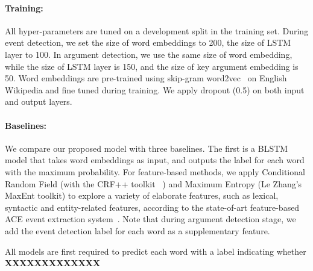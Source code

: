 \paragraph{Training:} All hyper-parameters are tuned on a development split in the training set. During event detection, we set the size of word embeddings to 200, the size of LSTM layer to 100. In argument detection, we use the same size of word embedding, while the size of LSTM layer is 150, and the size of key argument embedding is 50. Word embeddings are pre-trained using skip-gram word2vec~\cite{mikolov2013distributed} on English Wikipedia and fine tuned during training. We apply dropout (0.5) on both input and output layers.




\paragraph{Baselines:}
We compare our proposed model with three baselines. %
The first is a  BLSTM model that takes word embeddings as input, and outputs the label for each word with the maximum probability. %
For feature-based methods, we apply Conditional Random Field \cite{lafferty2001conditional} (with the CRF++ toolkit~\cite{kudo2005crf++} ) and Maximum Entropy \cite{berger1996maximum} (Le Zhang's MaxEnt toolkit) to explore a variety of elaborate features, such as lexical, syntactic and entity-related features, according to the state-of-art feature-based ACE event extraction system~\cite{li2013joint}. Note that during argument detection stage, we add the event detection label for each word  as a supplementary feature. 

All models are first required to predict each word with a label indicating whether \textbf{XXXXXXXXXXXXX}
 

